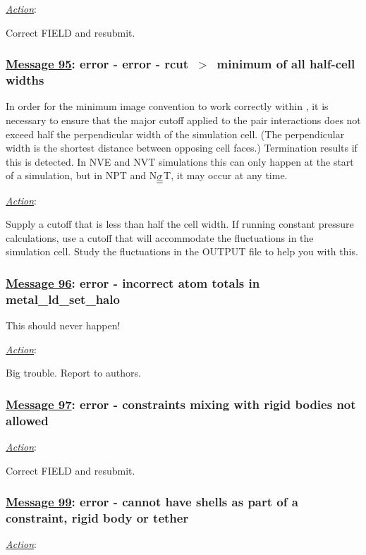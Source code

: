 \noindent \underline{\em Action}:

Correct FIELD and resubmit.

\subsubsection*{\underline{Message 95}: error - error - rcut~$>$~minimum of all half-cell widths}

In order for the minimum image convention to work correctly within
\D, it is necessary to ensure that the major cutoff applied to the
pair interactions does not exceed half the perpendicular width of
the simulation cell.  (The perpendicular width is the shortest
distance between opposing cell faces.)  Termination results if
this is detected. In NVE and NVT simulations this can only happen
at the start of a simulation, but in NPT and N$\mbox{$\underline{\underline{\bf \sigma}}$}$T, it
may occur at any time.

\noindent \underline{\em Action}:

Supply a cutoff that is less than half the cell width.  If running
constant pressure calculations, use a cutoff that will accommodate
the fluctuations in the simulation cell.  Study the fluctuations
in the OUTPUT file to help you with this.

\subsubsection*{\underline{Message 96}: error - incorrect atom totals in metal\_ld\_set\_halo}

This should never happen!

\noindent \underline{\em Action}:

Big trouble.  Report to authors.

\subsubsection*{\underline{Message 97}: error - constraints mixing with rigid bodies not allowed}

\noindent \underline{\em Action}:

Correct FIELD and resubmit.

\subsubsection*{\underline{Message 99}: error - cannot have shells as part of a constraint, rigid body or tether}

\noindent \underline{\em Action}:


